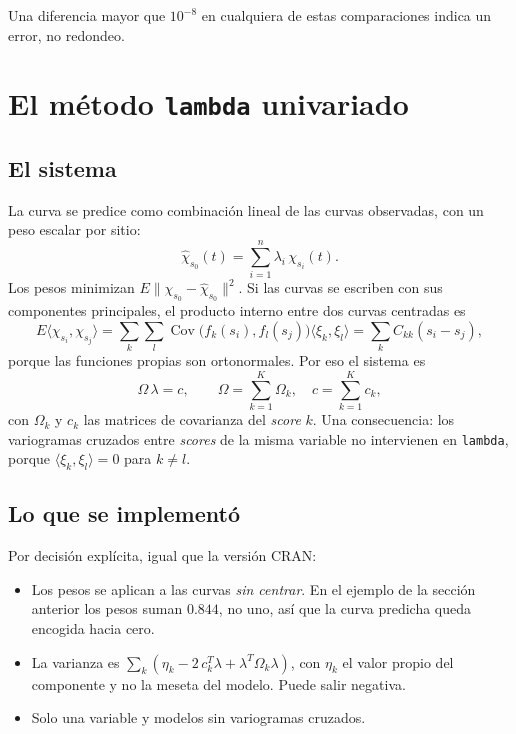 \documentclass[11pt,a4paper]{article}
\newcommand{\code}[1]{\texttt{#1}}
\begin{document}
Una diferencia mayor que $10^{-8}$ en cualquiera de estas comparaciones
indica un error, no redondeo.

\section{El método \code{lambda} univariado}

\subsection{El sistema}

La curva se predice como combinación lineal de las curvas observadas, con un
peso escalar por sitio:
\[
  \hat\chi_{s_0}(t) = \sum_{i=1}^{n} \lambda_i\,\chi_{s_i}(t).
\]
Los pesos minimizan $E\lVert \chi_{s_0} - \hat\chi_{s_0}\rVert^2$. Si las
curvas se escriben con sus componentes principales, el producto interno entre
dos curvas centradas es
\[
  E\langle \chi_{s_i}, \chi_{s_j} \rangle
  = \sum_{k}\sum_{l} \operatorname{Cov}\bigl(f_k(s_i), f_l(s_j)\bigr)
    \langle \xi_k, \xi_l \rangle
  = \sum_{k} C_{kk}(s_i - s_j),
\]
porque las funciones propias son ortonormales. Por eso el sistema es
\[
  \Omega\,\lambda = c,
  \qquad
  \Omega = \sum_{k=1}^{K} \Omega_k, \quad c = \sum_{k=1}^{K} c_k ,
\]
con $\Omega_k$ y $c_k$ las matrices de covarianza del \emph{score} $k$. Una
consecuencia: los variogramas cruzados entre \emph{scores} de la misma
variable no intervienen en \code{lambda}, porque $\langle \xi_k, \xi_l
\rangle = 0$ para $k \ne l$.

\subsection{Lo que se implementó}

Por decisión explícita, igual que la versión CRAN:
\begin{itemize}
  \item Los pesos se aplican a las curvas \emph{sin centrar}. En el ejemplo
        de la sección anterior los pesos suman $0.844$, no uno, así que la
        curva predicha queda encogida hacia cero.
  \item La varianza es $\sum_k \left(\eta_k - 2\,c_k^{T}\lambda +
        \lambda^{T}\Omega_k\lambda\right)$, con $\eta_k$ el valor propio del
        componente y no la meseta del modelo. Puede salir negativa.
  \item Solo una variable y modelos sin variogramas cruzados.
\end{itemize}
\end{document}
